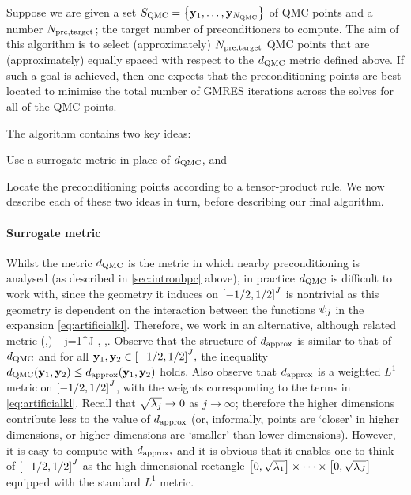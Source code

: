 Suppose we are given a set $\SQMC = \set{\byo,\ldots,\byNQMC}$ of QMC points and a number $N_{\mathrm{pre,target}}$; the target number of preconditioners to compute. The aim of this algorithm is to select (approximately) $N_{\mathrm{pre,target}}$ QMC points that are (approximately) equally spaced with respect to the $d_{\mathrm{QMC}}$ metric defined above. If such a goal is achieved, then one expects that the preconditioning points are best located to minimise the total number of GMRES iterations across the solves for all of the QMC points.

The algorithm contains two key ideas:
\ben
  \item Use a surrogate metric in place of $d_{\mathrm{QMC}}$, and
\item Locate the preconditioning points according to a tensor-product rule.
  \een
  We now describe each of these two ideas in turn, before describing our final algorithm.

\paragraph{Surrogate metric} Whilst the metric $d_{\mathrm{QMC}}$ is the metric in which  nearby preconditioning is analysed (as described in \cref{sec:intronbpc} above), in practice $d_{\mathrm{QMC}}$ is difficult to work with, since the  geometry it induces on $\cube{J}$ is nontrivial as this geometry is dependent on the interaction between the functions $\psi_{j}$ in the expansion \cref{eq:artificialkl}. Therefore, we work in an alternative, although related metric
  \beq\label{eq:dapprox}
\dapprox(\byo,\byt) \de \sum_{j=1}^{J} \sqrt{\lambdaj} , \tfor \byo,\byt \in {}.
\eeq
Observe that the structure of $d_{\mathrm{approx}}$ is similar to that of $d_{\mathrm{QMC}}$ and for all $\byo,\byt \in \cube{J},$ the inequality $\dQMC\mleft(\byo,\byt\mright) \leq \dapprox\mleft(\byo,\byt\mright)$ holds. Also observe that $d_{\mathrm{approx}}$ is a weighted $L^1$ metric on $\cube{J}$, with the weights corresponding to the terms in \cref{eq:artificialkl}. Recall that $\sqrt{\lambda_{j}} \rightarrow 0$ as $j \rightarrow \infty$; therefore the higher dimensions contribute less to the value of $d_{\mathrm{approx}}$ (or, informally, points are `closer' in higher dimensions, or higher dimensions are `smaller' than lower dimensions). However, it is easy to compute with $d_{\mathrm{approx}},$ and it is obvious that it enables one to think of $\cube{J}$ as the high-dimensional rectangle $\mleft[0,\sqrt{\lambdao}\mright]\times\cdots\times\mleft[0,\sqrt{\lambdaJ}\mright]$ equipped with the standard $L^1$ metric.

